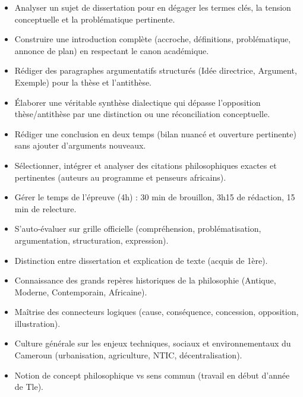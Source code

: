 \documentclass[11pt]{article}
\begin{document}
\begin{objectifs}
\begin{itemize}
\item Analyser un sujet de dissertation pour en dégager les termes clés, la tension conceptuelle et la problématique pertinente.
\item Construire une introduction complète (accroche, définitions, problématique, annonce de plan) en respectant le canon académique.
\item Rédiger des paragraphes argumentatifs structurés (Idée directrice, Argument, Exemple) pour la thèse et l'antithèse.
\item Élaborer une véritable synthèse dialectique qui dépasse l'opposition thèse/antithèse par une distinction ou une réconciliation conceptuelle.
\item Rédiger une conclusion en deux temps (bilan nuancé et ouverture pertinente) sans ajouter d'arguments nouveaux.
\item Sélectionner, intégrer et analyser des citations philosophiques exactes et pertinentes (auteurs au programme et penseurs africains).
\item Gérer le temps de l'épreuve (4h) : 30 min de brouillon, 3h15 de rédaction, 15 min de relecture.
\item S'auto-évaluer sur grille officielle (compréhension, problématisation, argumentation, structuration, expression).
\end{itemize}
\end{objectifs}

\begin{prerequis}
\begin{itemize}
\item Distinction entre dissertation et explication de texte (acquis de 1ère).
\item Connaissance des grands repères historiques de la philosophie (Antique, Moderne, Contemporain, Africaine).
\item Maîtrise des connecteurs logiques (cause, conséquence, concession, opposition, illustration).
\item Culture générale sur les enjeux techniques, sociaux et environnementaux du Cameroun (urbanisation, agriculture, NTIC, décentralisation).
\item Notion de concept philosophique vs sens commun (travail en début d'année de Tle).
\end{itemize}
\end{prerequis}

\newpage
\end{document}
